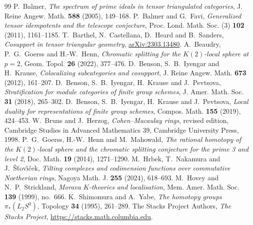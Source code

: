 \documentclass[11pt,reqno]{amsart}
\theoremstyle{definition}
\numberwithin{equation}{section}
\begin{document}
\begin{thebibliography}{99}
 P.~Balmer, \emph{The spectrum of prime ideals in tensor triangulated categories}, J. Reine Angew. Math. \textbf{588} (2005), 149--168.
 P.~Balmer and G.~Favi, \emph{Generalized tensor idempotents and the telescope conjecture}, Proc. Lond. Math. Soc. (3) \textbf{102} (2011), 1161--1185.
 T.~Barthel, N.~Castellana, D.~Heard and B.~Sanders, \emph{Cosupport in tensor triangular geometry}, \href{https://arxiv.org/abs/2303.13480}{arXiv:2303.13480}.
 A.~Beaudry, P.~G.~Goerss and H.-W.~Henn, \emph{Chromatic splitting for the $K(2)$-local sphere at $p=2$}, Geom. Topol. \textbf{26} (2022), 377--476.
 D.~Benson, S.~B.~Iyengar and H.~Krause, \emph{Colocalizing subcategories and cosupport}, J. Reine Angew. Math. \textbf{673} (2012), 161--207.
 D.~Benson, S.~B.~Iyengar, H.~Krause and J.~Pevtsova, \emph{Stratification for module categories of finite group schemes}, J. Amer. Math. Soc. \textbf{31} (2018), 265--302.
 D.~Benson, S.~B.~Iyengar, H.~Krause and J.~Pevtsova, \emph{Local duality for representations of finite group schemes}, Compos. Math. \textbf{155} (2019), 424--453.
 W.~Bruns and J.~Herzog, \emph{Cohen--Macaulay rings}, revised edition, Cambridge Studies in Advanced Mathematics 39, Cambridge University Press, 1998.
 P.~G.~Goerss, H.-W.~Henn and M.~Mahowald, \emph{The rational homotopy of the $K(2)$-local sphere and the chromatic splitting conjecture for the prime 3 and level 2}, Doc. Math. \textbf{19} (2014), 1271--1290.
 M.~Hrbek, T.~Nakamura and J.~\v{S}\v{t}ov\'{\i}\v{c}ek, \emph{Tilting complexes and codimension functions over commutative Noetherian rings}, Nagoya Math. J. \textbf{255} (2024), 618--693.
 M.~Hovey and N.~P.~Strickland, \emph{Morava $K$-theories and localisation}, Mem. Amer. Math. Soc. \textbf{139} (1999), no.~666.
 K.~Shimomura and A.~Yabe, \emph{The homotopy groups $\pi_*(L_2S^0)$}, Topology \textbf{34} (1995), 261--289.
 The Stacks Project Authors, \emph{The Stacks Project}, \url{https://stacks.math.columbia.edu}.
\end{thebibliography}
\end{document}
